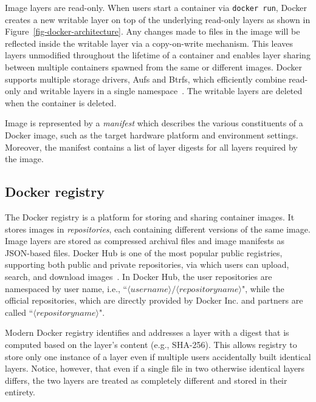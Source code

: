 Image layers are read-only.
%
When users start a container via {\tt docker run}, Docker creates a new
writable layer on top of the underlying read-only layers as shown in
Figure~\ref{fig-docker-architecture}.
%
Any changes made to files in the image will be reflected inside the writable
layer via a copy-on-write mechanism.
%
This leaves layers unmodified throughout the lifetime of a container and
enables layer sharing between multiple containers spawned from the same or
different images.
%
Docker supports multiple storage drivers, \eg Aufs and Btrfs, which efficiently
combine read-only and writable layers in a single
namespace~\cite{docker-driver-eval}.
%
The writable layers are deleted when the container is deleted.

Image is represented by a \emph{manifest} which describes the various
constituents of a Docker image, such as the target hardware platform and
environment settings.
%
Moreover, the manifest contains a list of layer digests for all layers required
by the image.


\subsection{Docker registry}
\label{sec:docker-registry}

The Docker registry is a platform for storing and sharing container images.
%
It stores images in \emph{repositories}, each containing different versions of
the same image.
%
Image layers are stored as compressed archival files and image manifests as
JSON-based files.
%
Docker Hub is one of the most popular public registries, supporting both public
and private repositories, via which users can upload, search, and download
images~\cite{docker-hub}.
%
In Docker Hub, the user repositories are namespaced by user name, i.e.,
``$\langle username\rangle/\langle repository name \rangle$", while the
official repositories, which are directly provided by Docker Inc. and partners
are called ``$\langle repository name \rangle$".

Modern Docker registry identifies and addresses a layer with a digest that is
computed based on the layer's content (e.g., SHA-256).
%
This allows registry to store only one instance of a layer even if multiple
users accidentally built identical layers.
%
Notice, however, that even if a single file in two otherwise identical layers
differs, the two layers are treated as completely different and stored in their
entirety.




